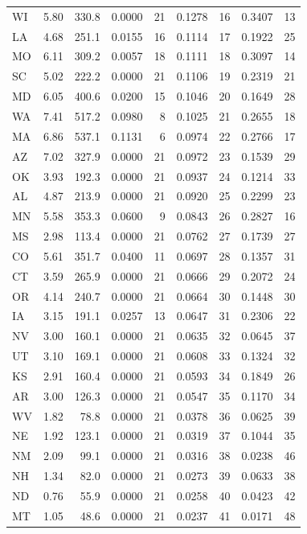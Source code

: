 \documentclass[12pt,oneside]{book}
\begin{document}
\begin{footnotesize}
\begin{singlespace}
\begin{longtable}{l r r r r r r r r}
WI & 5.80 & 330.8 & 0.0000 & 21 & 0.1278 & 16 & 0.3407 & 13 \\
LA & 4.68 & 251.1 & 0.0155 & 16 & 0.1114 & 17 & 0.1922 & 25 \\
MO & 6.11 & 309.2 & 0.0057 & 18 & 0.1111 & 18 & 0.3097 & 14 \\
SC & 5.02 & 222.2 & 0.0000 & 21 & 0.1106 & 19 & 0.2319 & 21 \\
MD & 6.05 & 400.6 & 0.0200 & 15 & 0.1046 & 20 & 0.1649 & 28 \\
WA & 7.41 & 517.2 & 0.0980 & 8 & 0.1025 & 21 & 0.2655 & 18 \\
MA & 6.86 & 537.1 & 0.1131 & 6 & 0.0974 & 22 & 0.2766 & 17 \\
AZ & 7.02 & 327.9 & 0.0000 & 21 & 0.0972 & 23 & 0.1539 & 29 \\
OK & 3.93 & 192.3 & 0.0000 & 21 & 0.0937 & 24 & 0.1214 & 33 \\
AL & 4.87 & 213.9 & 0.0000 & 21 & 0.0920 & 25 & 0.2299 & 23 \\
MN & 5.58 & 353.3 & 0.0600 & 9 & 0.0843 & 26 & 0.2827 & 16 \\
MS & 2.98 & 113.4 & 0.0000 & 21 & 0.0762 & 27 & 0.1739 & 27 \\
CO & 5.61 & 351.7 & 0.0400 & 11 & 0.0697 & 28 & 0.1357 & 31 \\
CT & 3.59 & 265.9 & 0.0000 & 21 & 0.0666 & 29 & 0.2072 & 24 \\
OR & 4.14 & 240.7 & 0.0000 & 21 & 0.0664 & 30 & 0.1448 & 30 \\
IA & 3.15 & 191.1 & 0.0257 & 13 & 0.0647 & 31 & 0.2306 & 22 \\
NV & 3.00 & 160.1 & 0.0000 & 21 & 0.0635 & 32 & 0.0645 & 37 \\
UT & 3.10 & 169.1 & 0.0000 & 21 & 0.0608 & 33 & 0.1324 & 32 \\
KS & 2.91 & 160.4 & 0.0000 & 21 & 0.0593 & 34 & 0.1849 & 26 \\
AR & 3.00 & 126.3 & 0.0000 & 21 & 0.0547 & 35 & 0.1170 & 34 \\
WV & 1.82 & 78.8 & 0.0000 & 21 & 0.0378 & 36 & 0.0625 & 39 \\
NE & 1.92 & 123.1 & 0.0000 & 21 & 0.0319 & 37 & 0.1044 & 35 \\
NM & 2.09 & 99.1 & 0.0000 & 21 & 0.0316 & 38 & 0.0238 & 46 \\
NH & 1.34 & 82.0 & 0.0000 & 21 & 0.0273 & 39 & 0.0633 & 38 \\
ND & 0.76 & 55.9 & 0.0000 & 21 & 0.0258 & 40 & 0.0423 & 42 \\
MT & 1.05 & 48.6 & 0.0000 & 21 & 0.0237 & 41 & 0.0171 & 48 \\

\end{longtable}
\end{singlespace}
\end{footnotesize}
\end{document}
